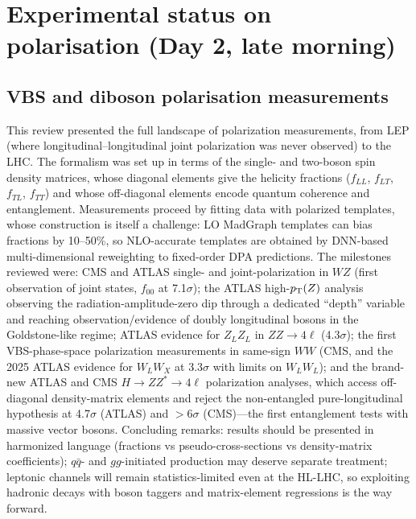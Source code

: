 \section{Experimental status on polarisation (Day 2, late morning)}

\subsection{VBS and diboson polarisation measurements}
This review presented the full landscape of polarization measurements, from
LEP (where longitudinal--longitudinal joint polarization was never observed) to
the LHC. The formalism was set up in terms of the single- and two-boson spin
density matrices, whose diagonal elements give the helicity fractions
($f_{LL}$, $f_{LT}$, $f_{TL}$, $f_{TT}$) and whose off-diagonal elements encode
quantum coherence and entanglement. Measurements proceed by fitting data with
polarized templates, whose construction is itself a challenge: LO MadGraph
templates can bias fractions by 10--50\%, so NLO-accurate templates are
obtained by DNN-based multi-dimensional reweighting to fixed-order DPA
predictions. The milestones reviewed were: CMS and ATLAS single- and
joint-polarization in $WZ$ (first observation of joint states, $f_{00}$ at
7.1$\sigma$); the ATLAS high-$p_{\mathrm{T}}(Z)$ analysis observing the
radiation-amplitude-zero dip through a dedicated ``depth'' variable and
reaching observation/evidence of doubly longitudinal bosons in the
Goldstone-like regime; ATLAS evidence for $Z_LZ_L$ in $ZZ\to4\ell$
(4.3$\sigma$); the first VBS-phase-space polarization measurements in
same-sign $WW$ (CMS, and the 2025 ATLAS evidence for $W_LW_X$ at 3.3$\sigma$
with limits on $W_LW_L$); and the brand-new ATLAS and CMS $H\to ZZ^*\to4\ell$
polarization analyses, which access off-diagonal density-matrix elements and
reject the non-entangled pure-longitudinal hypothesis at 4.7$\sigma$ (ATLAS)
and $>6\sigma$ (CMS)---the first entanglement tests with massive vector bosons.
Concluding remarks: results should be presented in harmonized language
(fractions vs pseudo-cross-sections vs density-matrix coefficients);
$q\bar q$- and $gg$-initiated production may deserve separate treatment;
leptonic channels will remain statistics-limited even at the HL-LHC, so
exploiting hadronic decays with boson taggers and matrix-element regressions
is the way forward.

